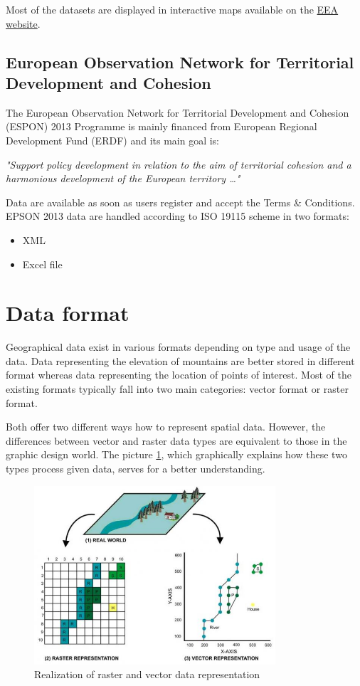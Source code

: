 \documentclass[thesis=M,english]{FITthesis}[2012/10/20]
\begin{document}
Most of the datasets are displayed in interactive maps available on the \href{http://www.eea.europa.eu/data-and-maps}{EEA website}.


\subsection{European Observation Network for Territorial Development and Cohesion}
The European Observation Network for Territorial Development and Cohesion (ESPON) 2013 Programme is mainly financed from European Regional Development Fund (ERDF) and its main goal is:

\textit{"Support policy development in relation to the aim of territorial cohesion and a harmonious development of the European territory \ldots "} \cite{ESPON13}

Data are available as soon as users register and accept the Terms \& Conditions. EPSON 2013 data are handled according to ISO 19115 scheme in two formats:

\begin{itemize}
\item XML
\item Excel file
\end{itemize}

\section{Data format}
Geographical data exist in various formats depending on type and usage of the data. Data representing the elevation of mountains are better stored in different format whereas data representing the location of points of interest. 
Most of the existing formats typically fall into two main categories: vector format or raster format. 

Both offer two different ways how to represent spatial data. However, the differences between vector and raster data types are equivalent to those in the graphic design world. The picture \ref{pic:RasterVector}, which graphically explains how these two types process given data, serves for a better understanding.

\begin{figure}[h]
\centering
\includegraphics[width=0.8\textwidth]{pics/RasterVectorPreview}
\caption{Realization of raster and vector data representation}
\label{pic:RasterVector}
\end{figure}
\end{document}
